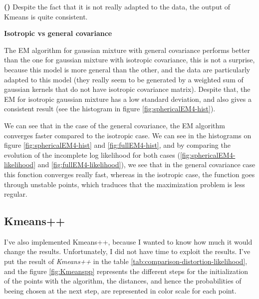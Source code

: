 \documentclass[a4paper, 11pt]{article}
\newcounter{cquestion}[subsection]
\newcounter{csubquestion}[cquestion]
\renewcommand{\thecsubquestion}{\alph{csubquestion}}
\newenvironment{subquestion}
{\par \vspace{0.5em} \noindent \stepcounter{csubquestion} \hspace{-1em}
 \textbf{(\thecsubquestion)}}
{}
\newcommand{\ipart}[1]{\vspace{0.5em}\textbf{#1}\vspace{0.5em}}
\begin{document}
\begin{subquestion}
  Despite the fact that it is not really adapted to the data, the
  output of Kmeans is quite consistent.


  \ipart{Isotropic vs general covariance}

  The EM algorithm for gaussian mixture with general covariance
  performs better than the one for gaussian mixture with isotropic
  covariance, this is not a surprise, because this model is more
  general than the other, and the data are particularly adapted to
  this model (they really seem to be generated by a weighted sum of
  gaussian kernels that do not have isotropic covariance matrix).
  Despite that, the EM for isotropic gaussian mixture has a
  low standard deviation, and also gives a consistent result (see the
  histogram in figure \ref{fig:sphericalEM4-hist}).

  We can see that in the case of the general covariance, the EM
  algorithm converges faster compared to the isotropic case. We can
  see in the histograms on figure \ref{fig:sphericalEM4-hist} and
  \ref{fig:fullEM4-hist}, and by comparing the evolution of the
  incomplete log likelihood for both cases
  (\ref{fig:sphericalEM4-likelihood} and
  \ref{fig:fullEM4-likelihood}), we see that in the general covariance
  case this fonction converges really fast,
  whereas in the isotropic case, the function goes through unstable
  points, which traduces that the maximization problem is less
  regular.

\end{subquestion}

\subsection*{Kmeans++}

I've also implemented Kmeans++, because I wanted to know how much
it would change the results. Unfortunately, I did not have time
to exploit the results. I've put the result of \emph{Kmeans++}
in the table \ref{tab:comparison-distortion-likelihood}, and
the figure \ref{fig:Kmeanspp} represents the different
steps for the initialization of the points with the algorithm,
the distances, and hence the probabilities of beeing chosen at
the next step, are represented in color scale for each point.
\end{document}
